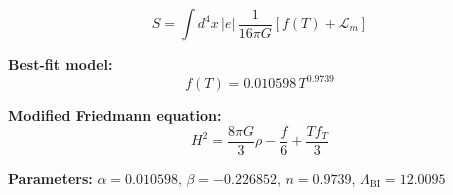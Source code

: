 
\begin{equation}
  S = \int d^4x \, |e| \, \frac{1}{16\pi G} \left[ f(T) + \mathcal{L}_m \right]
\end{equation}

\textbf{Best-fit model:}
\begin{equation}
  f(T) = 0.010598 \, T^{0.9739}
\end{equation}

\textbf{Modified Friedmann equation:}
\begin{equation}
  H^2 = \frac{8\pi G}{3} \rho - \frac{f}{6} + \frac{T f_T}{3}
\end{equation}

\textbf{Parameters:}
$\alpha = 0.010598$, \quad
$\beta = -0.226852$, \quad
$n = 0.9739$, \quad
$\Lambda_{\text{BI}} = 12.0095$